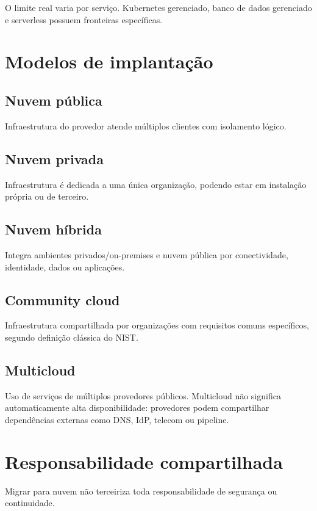 O limite real varia por serviço. Kubernetes gerenciado, banco de dados gerenciado e serverless possuem fronteiras específicas.

\section{Modelos de implantação}

\subsection{Nuvem pública}

Infraestrutura do provedor atende múltiplos clientes com isolamento lógico.

\subsection{Nuvem privada}

Infraestrutura é dedicada a uma única organização, podendo estar em instalação própria ou de terceiro.

\subsection{Nuvem híbrida}

Integra ambientes privados/on-premises e nuvem pública por conectividade, identidade, dados ou aplicações.

\subsection{Community cloud}

Infraestrutura compartilhada por organizações com requisitos comuns específicos, segundo definição clássica do NIST.

\subsection{Multicloud}

Uso de serviços de múltiplos provedores públicos. Multicloud não significa automaticamente alta disponibilidade: provedores podem compartilhar dependências externas como DNS, IdP, telecom ou pipeline.

\section{Responsabilidade compartilhada}

Migrar para nuvem não terceiriza toda responsabilidade de segurança ou continuidade.

